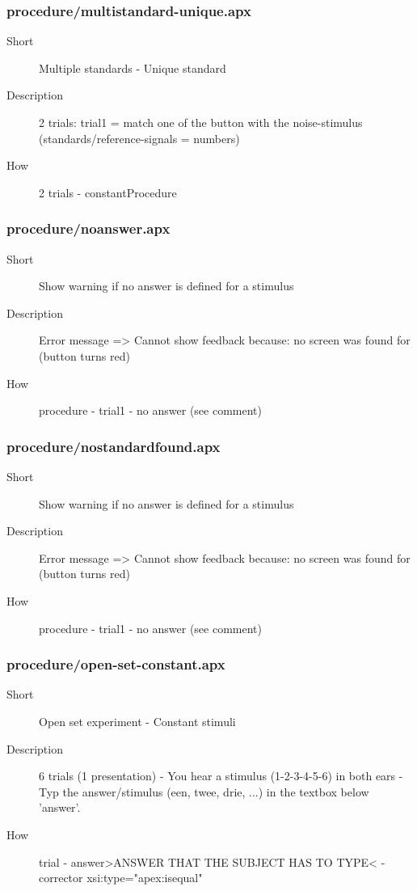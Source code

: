 \subsubsection{procedure/multistandard-unique.apx}
\begin{description}
\item[Short] 
 Multiple standards - Unique standard
\item[Description] 
 2 trials: trial1 = match one of the button with the noise-stimulus (standards/reference-signals = numbers)
\item[How] 
 2 trials - constantProcedure
\end{description}

\subsubsection{procedure/noanswer.apx}
\begin{description}
\item[Short] 
 Show warning if no answer is defined for a stimulus
\item[Description] 
 Error message =\textgreater{} Cannot show feedback because: no screen was found for (button turns red)
\item[How] 
 procedure - trial1 - no answer (see comment)
\end{description}

\subsubsection{procedure/nostandardfound.apx}
\begin{description}
\item[Short] 
 Show warning if no answer is defined for a stimulus
\item[Description] 
 Error message =\textgreater{} Cannot show feedback because: no screen was found for (button turns red)
\item[How] 
 procedure - trial1 - no answer (see comment)
\end{description}

\subsubsection{procedure/open-set-constant.apx}
\begin{description}
\item[Short] 
 Open set experiment - Constant stimuli
\item[Description] 
 6 trials (1 presentation) - You hear a stimulus (1-2-3-4-5-6) in both ears - Typ the answer/stimulus (een, twee, drie, ...) in the textbox below 'answer'.
\item[How] 
 trial - answer\textgreater{}ANSWER THAT THE SUBJECT HAS TO TYPE\textless{} - corrector xsi:type="apex:isequal"
\end{description}


